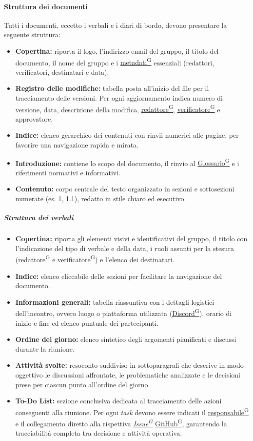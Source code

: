 \documentclass[a4paper,12pt]{article}
\providecommand{\glslink}[2]{\href{https://alittlebyte-19.github.io/Documentazione/glossario.html\#gls-#1}{\underline{#2}\textsuperscript{\scriptsize G}}}
\begin{document}
\paragraph{Struttura dei documenti}
Tutti i documenti, eccetto i verbali e i diari di bordo, devono presentare la seguente struttura:
\begin{itemize}
    \item \textbf{Copertina:} riporta il logo, l'indirizzo email del gruppo, il titolo del documento, il nome del gruppo e i \glslink{metadati}{metadati} essenziali (redattori, verificatori, destinatari e data).
    \item \textbf{Registro delle modifiche:} tabella posta all'inizio del file per il tracciamento delle versioni. Per ogni aggiornamento indica numero di versione, data, descrizione della modifica, \glslink{redattore}{redattore}, \glslink{verificatore}{verificatore} e approvatore.
    \item \textbf{Indice:} elenco gerarchico dei contenuti con rinvii numerici alle pagine, per favorire una navigazione rapida e mirata.
    \item \textbf{Introduzione:} contiene lo scopo del documento, il rinvio al \glslink{glossario}{Glossario} e i riferimenti normativi e informativi.
    \item \textbf{Contenuto:} corpo centrale del testo organizzato in sezioni e sottosezioni numerate (es. 1, 1.1), redatto in stile chiaro ed esecutivo.
\end{itemize}

\subparagraph{Struttura dei verbali}\label{sec:documentazione}
\begin{itemize}
    \item \textbf{Copertina:} riporta gli elementi visivi e identificativi del gruppo, il titolo con l'indicazione del tipo di verbale e della data, i ruoli assunti per la stesura (\glslink{redattore}{redattore} e \glslink{verificatore}{verificatore}) e l'elenco dei destinatari.
    \item \textbf{Indice:} elenco cliccabile delle sezioni per facilitare la navigazione del documento.
    \item \textbf{Informazioni generali:} tabella riassuntiva con i dettagli logistici dell'incontro, ovvero luogo o piattaforma utilizzata (\glslink{discord}{Discord}), orario di inizio e fine ed elenco puntuale dei partecipanti.
    \item \textbf{Ordine del giorno:} elenco sintetico degli argomenti pianificati e discussi durante la riunione.
    \item \textbf{Attività svolte:} resoconto suddiviso in sottoparagrafi che descrive in modo oggettivo le discussioni affrontate, le problematiche analizzate e le decisioni prese per ciascun punto all'ordine del giorno.
    \item \textbf{To-Do List:} sezione conclusiva dedicata al tracciamento delle azioni conseguenti alla riunione. Per ogni \textit{task} devono essere indicati il \glslink{responsabile}{responsabile} e il collegamento diretto alla rispettiva \textit{\glslink{issue}{Issue}} \glslink{github}{GitHub}, garantendo la tracciabilità completa tra decisione e attività operativa.
\end{itemize}
\end{document}
